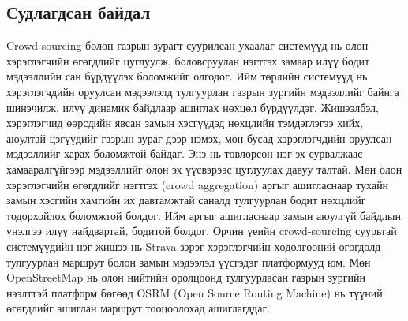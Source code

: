     \subsection*{Судлагдсан байдал}
        Crowd-sourcing болон газрын зурагт суурилсан ухаалаг системүүд нь олон хэрэглэгчийн өгөгдлийг цуглуулж, боловсруулан нэгтгэх замаар илүү бодит мэдээллийн сан бүрдүүлэх боломжийг олгодог. Ийм төрлийн системүүд нь хэрэглэгчдийн оруулсан мэдээлэлд тулгуурлан газрын зургийн мэдээллийг байнга шинэчилж, илүү динамик байдлаар ашиглах нөхцөл бүрдүүлдэг.
        Жишээлбэл, хэрэглэгчид өөрсдийн явсан замын хэсгүүдэд нөхцлийн тэмдэглэгээ хийх, аюултай цэгүүдийг газрын зураг дээр нэмэх, мөн бусад хэрэглэгчдийн оруулсан мэдээллийг харах боломжтой байдаг. Энэ нь төвлөрсөн нэг эх сурвалжаас хамааралгүйгээр мэдээллийг олон эх үүсвэрээс цуглуулах давуу талтай.
        Мөн олон хэрэглэгчийн өгөгдлийг нэгтгэх (crowd aggregation) аргыг ашигласнаар тухайн замын хэсгийн хамгийн их давтамжтай саналд тулгуурлан бодит нөхцлийг тодорхойлох боломжтой болдог. Ийм аргыг ашигласнаар замын аюулгүй байдлын үнэлгээ илүү найдвартай, бодитой болдог.
        Орчин үеийн crowd-sourcing суурьтай системүүдийн нэг жишээ нь Strava зэрэг хэрэглэгчийн хөдөлгөөний өгөгдөлд тулгуурлан маршрут болон замын мэдээлэл үүсгэдэг платформууд юм. Мөн OpenStreetMap нь олон нийтийн оролцоонд тулгуурласан газрын зургийн нээлттэй платформ бөгөөд OSRM (Open Source Routing Machine) нь түүний өгөгдлийг ашиглан маршрут тооцоолохад ашиглагддаг.

